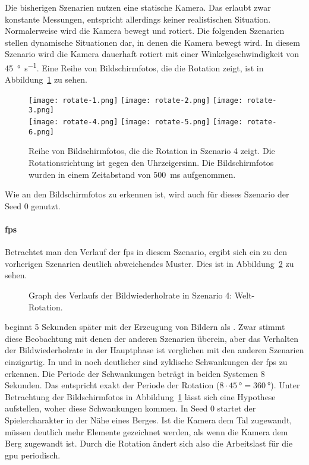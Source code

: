 Die bisherigen Szenarien nutzen eine statische Kamera. Das erlaubt zwar konstante Messungen, entspricht allerdings keiner realistischen Situation. Normalerweise wird die Kamera bewegt und rotiert. Die folgenden Szenarien stellen dynamische Situationen dar, in denen die Kamera bewegt wird. In diesem Szenario wird die Kamera dauerhaft rotiert mit einer Winkelgeschwindigkeit von \SI{45}{\degree\per\second}. Eine Reihe von Bildschirmfotos, die die Rotation zeigt, ist in Abbildung~\ref{fig:rotate} zu sehen.
\begin{figure}
	\centering
	\texttt{[image: rotate-1.png]}
	\texttt{[image: rotate-2.png]}
	\texttt{[image: rotate-3.png]}\\[4pt]
	\texttt{[image: rotate-4.png]}
	\texttt{[image: rotate-5.png]}
	\texttt{[image: rotate-6.png]}
	\caption{Reihe von Bildschirmfotos, die die Rotation in Szenario 4 zeigt. Die Rotationsrichtung ist gegen den Uhrzeigersinn. Die Bildschirmfotos wurden in einem Zeitabstand von \SI{500}{\milli\second} aufgenommen.}\label{fig:rotate}
\end{figure}
Wie an den Bildschirmfotos zu erkennen ist, wird auch für dieses Szenario der Seed 0 genutzt.

\paragraph{\ac{fps}}
Betrachtet man den Verlauf der \ac{fps} in diesem Szenario, ergibt sich ein zu den vorherigen Szenarien deutlich abweichendes Muster. Dies ist in Abbildung~\ref{fig:seed-0-rotate-fps} zu sehen.
\begin{figure}[!htbp]
	\caption{Graph des Verlaufs der Bildwiederholrate in Szenario 4: Welt-Rotation.}\label{fig:seed-0-rotate-fps}
\end{figure}
\sysB{} beginnt 5 Sekunden später mit der Erzeugung von Bildern als \sysA{}. Zwar stimmt diese Beobachtung mit denen der anderen Szenarien überein, aber das Verhalten der Bildwiederholrate in der Hauptphase ist verglichen mit den anderen Szenarien einzigartig. In \sysA{} und in \sysB{} noch deutlicher sind zyklische Schwankungen der \ac{fps} zu erkennen. Die Periode der Schwankungen beträgt in beiden Systemen 8 Sekunden. Das entspricht exakt der Periode der Rotation ($8\cdot \SI{45}{\degree} = \SI{360}{\degree}$). Unter Betrachtung der Bildschirmfotos in Abbildung~\ref{fig:rotate} lässt sich eine Hypothese aufstellen, woher diese Schwankungen kommen. In Seed 0 startet der Spielercharakter in der Nähe eines Berges. Ist die Kamera dem Tal zugewandt, müssen deutlich mehr Elemente gezeichnet werden, als wenn die Kamera dem Berg zugewandt ist. Durch die Rotation ändert sich also die Arbeitslast für die \ac{gpu} periodisch.

